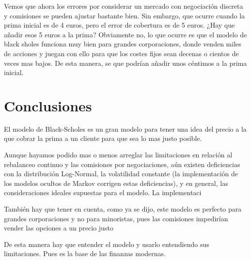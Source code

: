 \documentclass[11pt]{article}
\begin{document}
				Vemos que ahora los errores por considerar un mercado con negociación discreta y comisiones se pueden ajustar bastante bien. Sin embargo, que ocurre cuando la prima inicial es de 4 euros, pero el error de cobertura es de 5 euros. ¿Hay que añadir esos 5 euros a la prima? Obviamente no, lo que ocurre es que el modelo de black sholes funciona muy bien para grandes corporaciones, donde venden miles de acciones y juegan con ello para que los costes fijos sean decenas o cientos de veces mas bajos. De esta manera, se que podrían añadir unos céntimos a la prima inicial.
		
		\newpage
		\section{Conclusiones}
			El modelo de Black-Scholes es un gran modelo para tener una idea del precio a la que cobrar la prima a un cliente para que sea lo mas justo posible.
			
			Aunque hayamos podido mas o menos arreglar las limitaciones en relación al rebalanceo continuo y las comisiones por negociaciones, aún existen deficiencias con la distribución Log-Normal, la volatilidad constante (la implementación de los modelos ocultos de Markov corrigen estas deficiencias), y en general, las consideraciones ideales supuestas para el modelo. La implementaci
			
			También hay que tener en cuenta, como ya se dijo, este modelo es perfecto para grandes corporaciones y no para minoristas, pues las comisiones impedirían vender las opciones a un precio justo
			
			De esta manera hay que entender el modelo y usarlo entendiendo sus limitaciones. Pues es la base de las finanzas modernas.
	
	\renewcommand{\refname}{Bibliografía}
	
\end{document}
